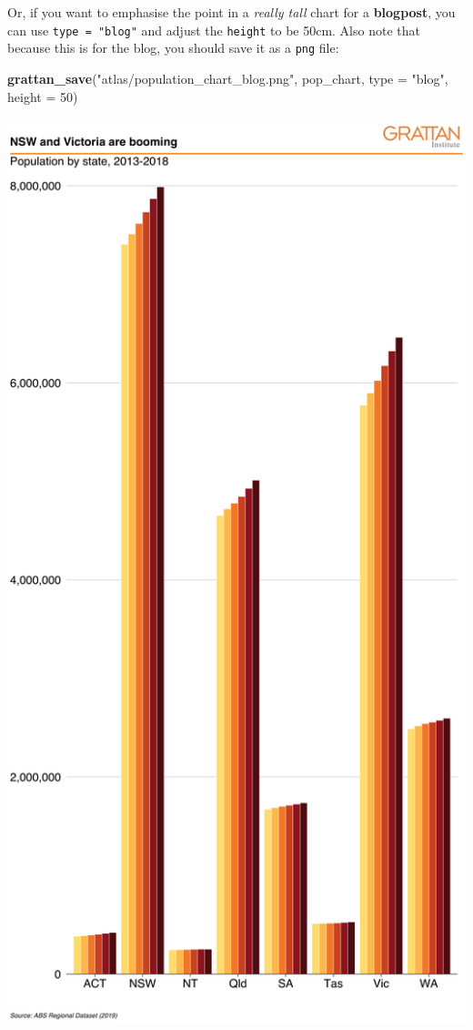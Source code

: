 \documentclass[]{book}
\newenvironment{Shaded}{\begin{snugshade}}{\end{snugshade}}
\newcommand{\DataTypeTok}[1]{\textcolor[rgb]{0.13,0.29,0.53}{#1}}
\newcommand{\DecValTok}[1]{\textcolor[rgb]{0.00,0.00,0.81}{#1}}
\newcommand{\KeywordTok}[1]{\textcolor[rgb]{0.13,0.29,0.53}{\textbf{#1}}}
\newcommand{\NormalTok}[1]{#1}
\newcommand{\StringTok}[1]{\textcolor[rgb]{0.31,0.60,0.02}{#1}}
\begin{document}
Or, if you want to emphasise the point in a \emph{really tall} chart for a \textbf{blogpost}, you can use \texttt{type\ =\ "blog"} and adjust the \texttt{height} to be 50cm. Also note that because this is for the blog, you should save it as a \texttt{png} file:

\begin{Shaded}
\begin{Highlighting}[]
\KeywordTok{grattan_save}\NormalTok{(}\StringTok{"atlas/population_chart_blog.png"}\NormalTok{, pop_chart, }
             \DataTypeTok{type =} \StringTok{"blog"}\NormalTok{, }\DataTypeTok{height =} \DecValTok{50}\NormalTok{)}
\end{Highlighting}
\end{Shaded}

\includegraphics{atlas/population_chart_blog.png}
\end{document}
